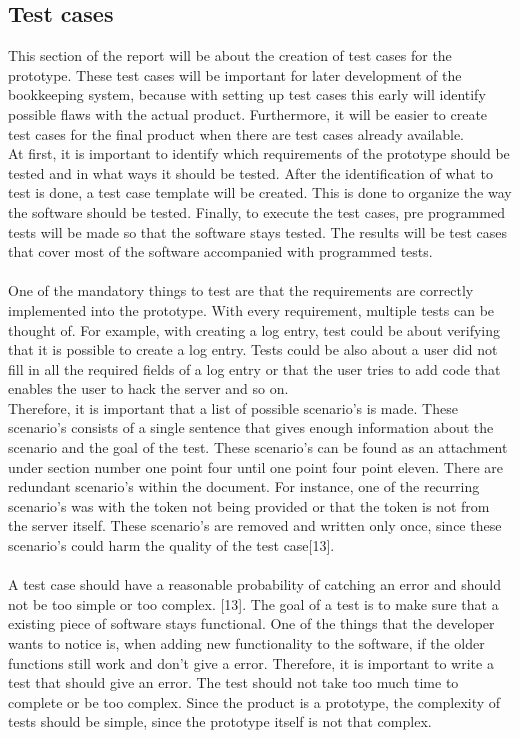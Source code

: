 \documentclass[paper=a4, fontsize=11pt,twoside]{scrartcl}	%
\begin{document}
\newpage
\subsection{Test cases}
This section of the report will be about the creation of test cases for the prototype. These test cases will be important for later development of the bookkeeping system, because with setting up test cases this early will identify possible flaws with the actual product.
Furthermore, it will be easier to create test cases for the final product when there are test cases already available. \\
At first, it is important to identify which requirements of the prototype should be tested and in what ways it should be tested. After the identification of what to test is done, a test case template will be created. This is done to organize the way the software should be tested. Finally, to execute the test cases, pre programmed tests will be made so that the software stays tested. The results will be test cases that cover most of the software accompanied with programmed tests. \\ \\
One of the mandatory things to test are that the requirements are correctly implemented into the prototype. With every requirement, multiple tests can be thought of. For example, with creating a log entry, test could be about verifying that it is possible to create a log entry. Tests could be also about a user did not fill in all the required fields of a log entry or that the user tries to add code that enables the user to hack the server and so on.  \\
Therefore, it is important that a list of possible scenario's is made. These scenario's consists of a single sentence that gives enough information about the scenario and the goal of the test. These scenario's can be found as an attachment under section number one point four until one point four point eleven. There are redundant scenario's within the document. For instance, one of the recurring scenario's was with the token not being provided or that the token is not from the server itself. These scenario's are removed and written only once, since these scenario's could harm the quality of the test case[13]. \\ \\
A test case should have a reasonable probability of catching an error and should not be too simple or too complex. [13]. The goal of a test is to make sure that a existing piece of software stays functional. One of the things that the developer wants to notice is, when adding new functionality to the software, if the older functions still work and don't give a error. Therefore, it is important to write a test  that should give an error. The test should not take too much time to complete or be too complex. Since the product is a prototype, the complexity of tests should be simple, since the prototype itself is not that complex. \\ 
\end{document}
